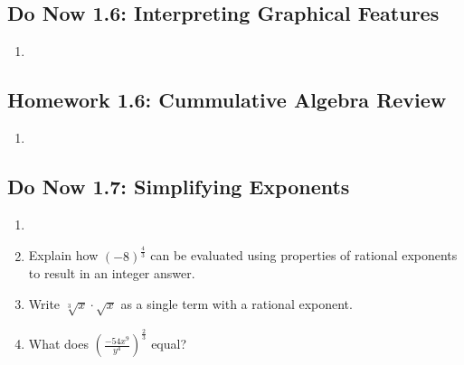 \documentclass[12pt, oneside]{article}
\begin{document}
\newpage
\subsection*{Do Now 1.6: Interpreting Graphical Features}
\begin{enumerate}
  \item
\end{enumerate}

\newpage
\subsection*{Homework 1.6: Cummulative Algebra Review}
\begin{enumerate}
  \item
\end{enumerate}


\newpage
\subsection*{Do Now 1.7: Simplifying Exponents}
\begin{enumerate}
  \item
  \item %
  Explain how $(-8)^\frac{4}{3}$ can be evaluated using properties of rational exponents to result in an integer answer.

  \item %
  Write $\sqrt[3]{x} \cdot \sqrt{x}$ as a single term with a rational exponent.

  \item %
  What does $\displaystyle \left( \frac{-54x^9}{y^4}\right)^{\frac{2}{3}}$ equal?

\end{enumerate}


\newpage
\end{document}
